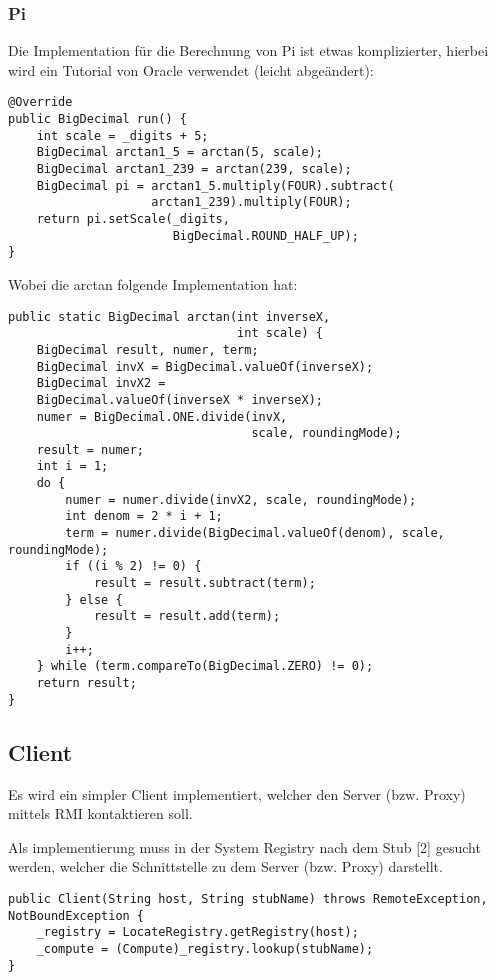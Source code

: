 \subsubsection{Pi}
Die Implementation für die Berechnung von Pi ist etwas komplizierter, hierbei wird ein Tutorial von Oracle verwendet (leicht abgeändert):

\begin{lstlisting}[style=Java, caption=Module Implementation - Pi run]
@Override
public BigDecimal run() {
	int scale = _digits + 5;
    BigDecimal arctan1_5 = arctan(5, scale);
    BigDecimal arctan1_239 = arctan(239, scale);
    BigDecimal pi = arctan1_5.multiply(FOUR).subtract(
					arctan1_239).multiply(FOUR);
    return pi.setScale(_digits,
                       BigDecimal.ROUND_HALF_UP);
}
\end{lstlisting}

Wobei die arctan folgende Implementation hat:

\begin{lstlisting}[style=Java, caption=Module Implementation - Pi arctan]
public static BigDecimal arctan(int inverseX,
                                int scale) {
	BigDecimal result, numer, term;
    BigDecimal invX = BigDecimal.valueOf(inverseX);
    BigDecimal invX2 =
    BigDecimal.valueOf(inverseX * inverseX);
	numer = BigDecimal.ONE.divide(invX,
    							  scale, roundingMode);
    result = numer;
    int i = 1;
    do {
		numer = numer.divide(invX2, scale, roundingMode);
		int denom = 2 * i + 1;
        term = numer.divide(BigDecimal.valueOf(denom), scale, roundingMode);
		if ((i % 2) != 0) {
        	result = result.subtract(term);
        } else {
            result = result.add(term);
        }
        i++;
    } while (term.compareTo(BigDecimal.ZERO) != 0);
    return result;
}
\end{lstlisting}

\clearpage

\subsection{Client}

Es wird ein simpler Client implementiert, welcher den Server (bzw. Proxy) mittels RMI kontaktieren soll.

Als implementierung muss in der System Registry nach dem Stub [2] gesucht werden, welcher die Schnittstelle zu dem Server (bzw. Proxy) darstellt.

\begin{lstlisting}[style=Java, caption=Client Implementation - Registry lookup]
public Client(String host, String stubName) throws RemoteException, NotBoundException {
    _registry = LocateRegistry.getRegistry(host);
    _compute = (Compute)_registry.lookup(stubName);
}
\end{lstlisting}


